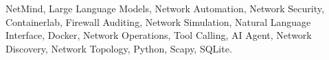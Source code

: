 
NetMind, Large Language Models, Network Automation, Network Security,
Containerlab, Firewall Auditing, Network Simulation, Natural Language
Interface, Docker, Network Operations, Tool Calling, AI Agent, Network
Discovery, Network Topology, Python, Scapy, SQLite.
